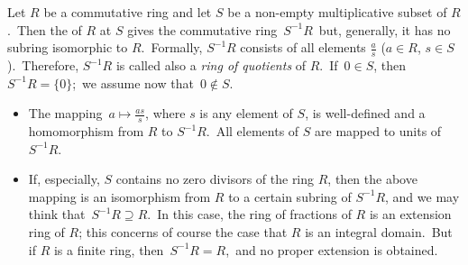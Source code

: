 \documentclass[12pt]{article}
\begin{document}
Let $R$ be a commutative ring and let $S$ be a non-empty multiplicative subset of $R$.\, Then the  of $R$ at $S$ gives the commutative ring \,$S^{-1}R$\, but, generally, it has no subring isomorphic to $R$.\, Formally, $S^{-1}R$ consists of all elements $\frac{a}{s}$ ($a \in R$, $s \in S$).\, Therefore, $S^{-1}R$ is called also a {\em ring of quotients} of $R$.\, If\, $0 \in S$, then\, 
$S^{-1}R = \{0\}$;\, we assume now that\, $0 \notin S$.

\begin{itemize}
\item The mapping \,$a \mapsto \frac{as}{s}$, where $s$ is any element of $S$, is well-defined and a homomorphism from $R$ to $S^{-1}R$. \,All elements of $S$ are mapped to units of $S^{-1}R$.
\item If, especially, $S$ contains no zero divisors of the ring $R$, then the above mapping is an isomorphism from $R$ to a certain subring of $S^{-1}R$, and we may think that\, $S^{-1}R \supseteq R$.\, In this case, the ring of fractions of $R$ is an extension ring of $R$; this concerns of course the case that $R$ is an integral domain.\, But if $R$ is a finite ring, then\, $S^{-1}R = R$,\, and no proper extension is obtained.
\end{itemize}
\end{document}
